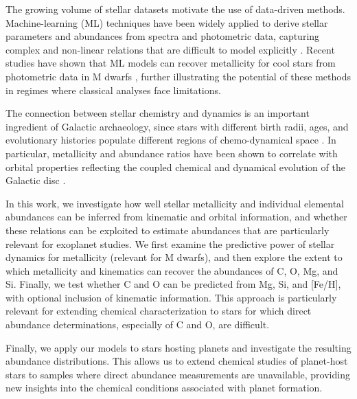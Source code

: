 \documentclass{aa}
\begin{document}
The growing volume of stellar datasets motivate the use of data-driven methods. Machine-learning (ML) techniques have been widely applied to derive stellar parameters and abundances from spectra and photometric data, capturing complex and non-linear relations that are difficult to model explicitly \citep{Ball-10,  Ness-15, Fabbro-18, Leung-19}. Recent studies have shown that ML models can recover metallicity for cool stars from photometric data in M dwarfs \citep{Duque-Arribas-25}, further illustrating the potential of these methods in regimes where classical analyses face limitations.

The connection between stellar chemistry and dynamics is an important ingredient of Galactic archaeology, since stars with different birth radii, ages, and evolutionary histories populate different regions of chemo-dynamical space \citep{Adibekyan-11, Boeche-13, Minchev-14, Ratcliffe-23, Hackshaw-24}. In particular, metallicity and abundance ratios have been shown to correlate with orbital properties reflecting the coupled chemical and dynamical evolution of the Galactic disc \citep{Boeche-13}.

In this work, we investigate how well stellar metallicity and individual elemental abundances can be inferred from kinematic and orbital information, and whether these relations can be exploited to estimate abundances that are particularly relevant for exoplanet studies. We first examine the predictive power of stellar dynamics for metallicity (relevant for M dwarfs), and then explore the extent to which metallicity and kinematics can recover the abundances of C, O, Mg, and Si. Finally, we test whether C and O can be predicted from Mg, Si, and [Fe/H], with optional inclusion of kinematic information. This approach is particularly relevant for extending chemical characterization to stars for which direct abundance determinations, especially of C and O, are difficult.

Finally, we apply our models to stars hosting planets and investigate the resulting abundance distributions. This allows us to extend chemical studies of planet-host stars to samples where direct abundance measurements are unavailable, providing new insights into the chemical conditions associated with planet formation.
\end{document}
